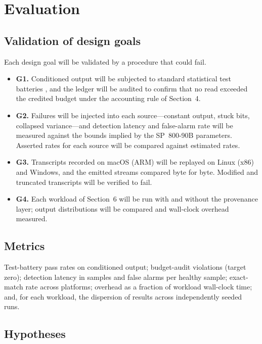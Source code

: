 \section{Evaluation}
 
\subsection{Validation of design goals}
 
Each design goal will be validated by a procedure that could fail.
 
\begin{itemize}
  \item \textbf{G1.} Conditioned output will be subjected to standard statistical test
        batteries \citep{lecuyer2007}, and the ledger will be audited to confirm that
        no read exceeded the credited budget under the accounting rule of Section~4.
  \item \textbf{G2.} Failures will be injected into each source---constant output,
        stuck bits, collapsed variance---and detection latency and false-alarm rate
        will be measured against the bounds implied by the SP~800-90B parameters.
        Asserted rates for each source will be compared against estimated rates.
  \item \textbf{G3.} Transcripts recorded on macOS (ARM) will be replayed on Linux (x86)
        and Windows, and the emitted streams compared byte for byte. Modified and
        truncated transcripts will be verified to fail.
  \item \textbf{G4.} Each workload of Section~6 will be run with and without the
        provenance layer; output distributions will be compared and wall-clock overhead
        measured.
\end{itemize}
 
\subsection{Metrics}
 
Test-battery pass rates on conditioned output; budget-audit violations (target zero);
detection latency in samples and false alarms per healthy sample; exact-match rate
across platforms; overhead as a fraction of workload wall-clock time; and, for each
workload, the dispersion of results across independently seeded runs.
 
\subsection{Hypotheses}
 

